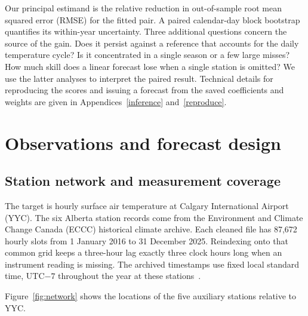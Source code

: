 \documentclass[11pt,letterpaper]{article}
\begin{document}
Our principal estimand is the relative reduction in out-of-sample root mean squared error (RMSE) for the fitted pair. A paired calendar-day block bootstrap quantifies its within-year uncertainty. Three additional questions concern the source of the gain. Does it persist against a reference that accounts for the daily temperature cycle? Is it concentrated in a single season or a few large misses? How much skill does a linear forecast lose when a single station is omitted? We use the latter analyses to interpret the paired result. Technical details for reproducing the scores and issuing a forecast from the saved coefficients and weights are given in Appendices~\ref{inference} and~\ref{reproduce}.


\section{Observations and forecast design}\label{data}


\subsection{Station network and measurement coverage}\label{network}
The target is hourly surface air temperature at Calgary International Airport (YYC). The six Alberta station records come from the Environment and Climate Change Canada (ECCC) historical climate archive. Each cleaned file has 87,672 hourly slots from 1 January 2016 to 31 December 2025. Reindexing onto that common grid keeps a three-hour lag exactly three clock hours long when an instrument reading is missing. The archived timestamps use fixed local standard time, UTC$-7$ throughout the year at these stations~\cite{eccc}.

Figure~\ref{fig:network} shows the locations of the five auxiliary stations relative to YYC.
\end{document}
